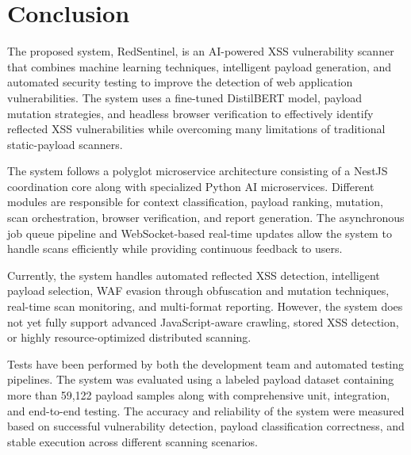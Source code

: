 \chapter{Conclusion}

The proposed system, RedSentinel, is an AI-powered XSS vulnerability scanner that combines machine learning techniques, intelligent payload generation, and automated security testing to improve the detection of web application vulnerabilities. The system uses a fine-tuned DistilBERT model, payload mutation strategies, and headless browser verification to effectively identify reflected XSS vulnerabilities while overcoming many limitations of traditional static-payload scanners.

The system follows a polyglot microservice architecture consisting of a NestJS coordination core along with specialized Python AI microservices. Different modules are responsible for context classification, payload ranking, mutation, scan orchestration, browser verification, and report generation. The asynchronous job queue pipeline and WebSocket-based real-time updates allow the system to handle scans efficiently while providing continuous feedback to users.

Currently, the system handles automated reflected XSS detection, intelligent payload selection, WAF evasion through obfuscation and mutation techniques, real-time scan monitoring, and multi-format reporting. However, the system does not yet fully support advanced JavaScript-aware crawling, stored XSS detection, or highly resource-optimized distributed scanning.

Tests have been performed by both the development team and automated testing pipelines. The system was evaluated using a labeled payload dataset containing more than 59,122 payload samples along with comprehensive unit, integration, and end-to-end testing. The accuracy and reliability of the system were measured based on successful vulnerability detection, payload classification correctness, and stable execution across different scanning scenarios.

